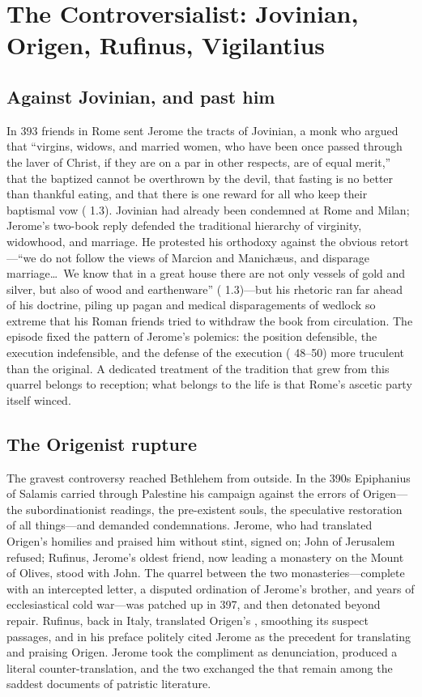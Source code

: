 \section{The Controversialist: Jovinian, Origen, Rufinus, Vigilantius}

\subsection{Against Jovinian, and past him}

In 393 friends in Rome sent Jerome the tracts of Jovinian, a monk who argued
that ``virgins, widows, and married women, who have been once passed through
the laver of Christ, if they are on a par in other respects, are of equal
merit,'' that the baptized cannot be overthrown by the devil, that fasting is
no better than thankful eating, and that there is one reward for all who keep
their baptismal vow ( 1.3). Jovinian had already been
condemned at Rome and Milan; Jerome's two-book reply defended the traditional
hierarchy of virginity, widowhood, and marriage. He protested his orthodoxy
against the obvious retort---``we do not follow the views of Marcion and
Manich\ae us, and disparage marriage\ldots\ We know that in a great house
there are not only vessels of gold and silver, but also of wood and
earthenware'' ( 1.3)---but his rhetoric ran far
ahead of his doctrine, piling up pagan and medical disparagements of wedlock
so extreme that his Roman friends tried to withdraw the book from
circulation. The episode fixed the pattern of Jerome's polemics: the position
defensible, the execution indefensible, and the defense of the execution
( 48--50) more truculent than the original. A dedicated
treatment of the tradition that grew from this quarrel belongs to reception;
what belongs to the life is that Rome's ascetic party itself winced.

\subsection{The Origenist rupture}

The gravest controversy reached Bethlehem from outside. In the 390s Epiphanius
of Salamis carried through Palestine his campaign against the errors of
Origen---the subordinationist readings, the pre-existent souls, the
speculative restoration of all things---and demanded condemnations. Jerome,
who had translated Origen's homilies and praised him without stint, signed
on; John of Jerusalem refused; Rufinus, Jerome's oldest friend, now leading a
monastery on the Mount of Olives, stood with John. The quarrel between the
two monasteries---complete with an intercepted letter, a disputed ordination
of Jerome's brother, and years of ecclesiastical cold war---was patched up in
397, and then detonated beyond repair. Rufinus, back in Italy, translated
Origen's , smoothing its suspect passages, and in
his preface politely cited Jerome as the precedent for translating and
praising Origen. Jerome took the compliment as denunciation, produced a
literal counter-translation, and the two exchanged the  that
remain among the saddest documents of patristic literature.

